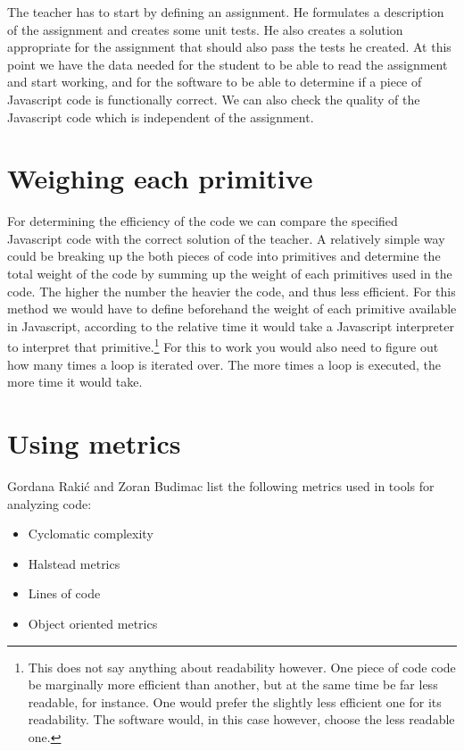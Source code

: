 \documentclass{article}
\begin{document}
The teacher has to start by defining an assignment. He formulates a description
of the assignment and creates some unit tests. He also creates a solution
appropriate for the assignment that should also pass the tests he created. At
this point we have the data needed for the student to be able to read the
assignment and start working, and for the software to be able to determine if a
piece of Javascript code is functionally correct. We can also check the quality
of the Javascript code which is independent of the assignment.

\section{Weighing each primitive}

For determining the efficiency of the code we can compare the specified
Javascript code with the correct solution of the teacher. A relatively simple
way could be breaking up the both pieces of code into primitives and determine
the total weight of the code by summing up the weight of each primitives used
in the code. The higher the number the heavier the code, and thus less
efficient. For this method we would have to define beforehand the weight of
each primitive available in Javascript, according to the relative time it would
take a Javascript interpreter to interpret that primitive.\footnote{This does
not say anything about readability however. One piece of code code be
marginally more efficient than another, but at the same time be far less
readable, for instance. One would prefer the slightly less efficient one for
its readability. The software would, in this case however, choose the less
readable one.} For this to work you would also need to figure out how many
times a loop is iterated over. The more times a loop is executed, the more time
it would take.

\section{Using metrics}

Gordana Rakić and Zoran Budimac\cite{rakic2013problems} list the following
metrics used in tools for analyzing code:

\begin{itemize}
  \item Cyclomatic complexity
  \item Halstead metrics
  \item Lines of code
  \item Object oriented metrics
\end{itemize}



\end{document}
